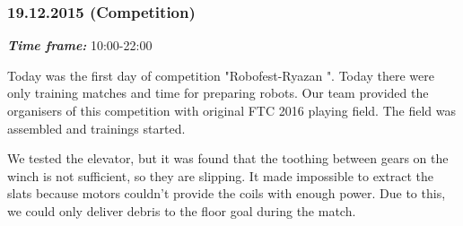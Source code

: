 \subsubsection{19.12.2015 (Competition)}
\textit{\textbf{Time frame:}} 10:00-22:00

Today was the first day of competition "Robofest-Ryazan ". Today there were only training matches and time for preparing robots. Our team provided the organisers of this competition with original FTC 2016 playing field. The field was assembled and trainings started.

We tested the elevator, but it was found that the toothing between gears on the winch is not sufficient, so they are slipping. It made impossible to extract the slats because motors couldn't provide the coils with enough power. Due to this, we could only deliver debris to the floor goal during the match.

